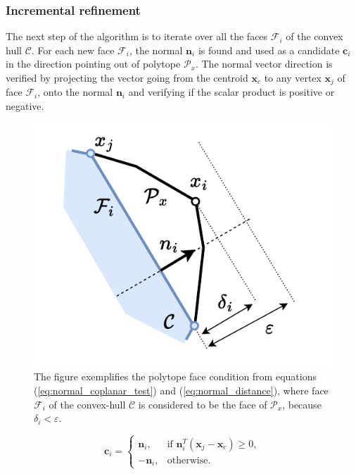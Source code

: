 \subsubsection{Incremental refinement} The next step of the algorithm is to iterate over all the faces $\mathcal{F}_i$ of the convex hull $\mathcal{C}$. For each new face $\mathcal{F}_i$, the normal $\bm{n}_i$ is found and used as a candidate $\bm{c}_i$ in the direction pointing out of polytope $\mathcal{P}_x$.
The normal vector direction is verified by projecting the vector going from the centroid $\bm{x}_c$ to any vertex $\bm{x}_{j}$ of face $\mathcal{F}_i$, onto the normal $\bm{n}_i$ and verifying if the scalar product is positive or negative.
\begin{figure}
    \centering
    \includegraphics[width=\linewidth]{Papers/images/espilon_explicaiton.pdf}
    \caption{ The figure exemplifies the polytope face condition from equations (\ref{eq:normal_coplanar_test}) and (\ref{eq:normal_distance}), where  face $\mathcal{F}_i$ of the convex-hull $\mathcal{C}$ is considered to be the face of $\mathcal{P}_x$, because $\delta_i\! < \!\varepsilon$. }
    \label{fig:expilon_explication}
\end{figure}
\begin{equation}
    \bm{c}_i = \begin{cases}
  \bm{n}_i, & \text{if } \bm{n}_i^T(\bm{x}_{j} - \bm{x}_c) \geq 0, \\
  -\bm{n}_i, & \text{otherwise}.
\end{cases} 
\label{eq:normal_condition}
\end{equation}
